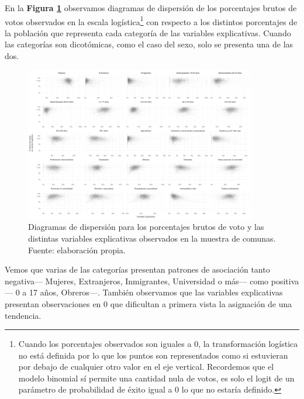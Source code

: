 En la \textbf{Figura \ref{fig:Disper_Voto_Variables}} observamos diagramas de dispersión de los porcentajes brutos de votos observados en la escala logística\footnote{Cuando los porcentajes observados son iguales a 0, la transformación logística no está definida por lo que los puntos son representados como si estuvieran por debajo de cualquier otro valor en el eje vertical. Recordemos que el modelo binomial sí permite una cantidad nula de votos, es solo el logit de un parámetro de probabilidad de éxito igual a 0 lo que no estaría definido.} con respecto a los distintos porcentajes de la población que representa cada categoría de las variables explicativas. Cuando las categorías son dicotómicas, como el caso del sexo, solo se presenta una de las dos.\\ 

\begin{figure}[h]
	\centering
	\includegraphics[width = 0.9\textwidth]{Figs/AED/Asociaciones_MUESTRA}
	\caption{Diagramas de dispersión para los porcentajes brutos de voto y las distintas variables explicativas observados en la muestra de comunas. Fuente: elaboración propia.}
	\label{fig:Disper_Voto_Variables}	
\end{figure}

Vemos que varias de las categorías presentan patrones de asociación tanto negativa--- Mujeres, Extranjeros, Inmigrantes, Universidad o más--- como positiva--- 0 a 17 años, Obreros---. También observamos que las variables explicativas presentan observaciones en 0 que dificultan a primera vista la asignación de una tendencia.\\


